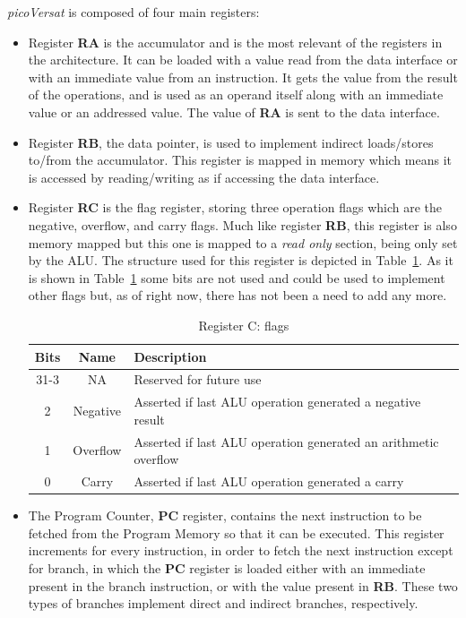 {\it picoVersat} is composed of four main registers:
\begin{itemize}
\item Register {\bf RA} is the accumulator and is the most relevant of the registers
in the architecture.  It can be loaded with a value read from the data interface
or with an immediate value from an instruction.  It gets the value from the
result of the operations, and is used as an operand itself along with an
immediate value or an addressed value. The value of {\bf RA} is sent to the data
interface.
%
\item Register {\bf RB}, the data pointer, is used to implement indirect loads/stores
to/from the accumulator.  This register is mapped in memory which means it is
accessed by reading/writing as if accessing the data interface.
%
\item Register {\bf RC} is the flag register, storing three operation flags which are
the negative, overflow, and carry flags.  Much like register {\bf RB}, this
register is also memory mapped but this one is mapped to a {\it read only}
section, being only set by the {\sc ALU}.  The structure used for this register
is depicted in Table~\ref{tab:flags}.  As it is shown in Table~\ref{tab:flags} some bits
are not used and could be used to implement other flags but, as of right now,
there has not been a need to add any more.

\begin{table}[!htbp]
  \centering
    \begin{tabular}{|c|c|p{7cm}|}
    \hline
    {\bf Bits} & {\bf Name} & {\bf Description} \\
    \hline \hline
     31-3 & NA & Reserved for future use\\
    \hline
     2 & Negative & Asserted if last {\sc ALU} operation generated a negative result\\
    \hline
     1 & Overflow &  Asserted if last {\sc ALU} operation generated an arithmetic overflow\\
    \hline
     0 & Carry & Asserted if last {\sc ALU} operation generated a carry\\
    \hline

    \end{tabular}
  \caption{Register C: flags}
  \label{tab:flags}
\end{table}

\item The Program Counter, {\bf PC} register, contains the next instruction to be
fetched from the Program Memory so that it can be executed.  This register
increments for every instruction, in order to fetch the next instruction except
for branch, in which the {\bf PC} register is loaded either with an immediate
present in the branch instruction, or with the value present in {\bf RB}.  These
two types of branches implement direct and indirect branches, respectively.
\end{itemize}

